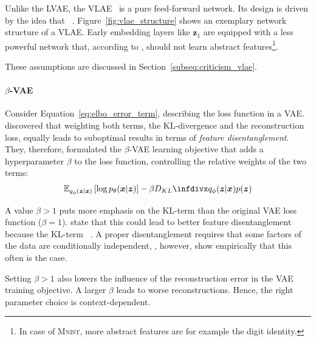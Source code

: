 Unlike the \ac{LVAE}, the \ac{VLAE}~\citep{zhao2017learning} is a pure feed-forward network.
Its design is driven by the idea that ~\citep{zhao2017learning}.
Figure~\ref{fig:vlae_structure} shows an exemplary network structure of a \ac{VLAE}.
Early embedding layers like $\bm{z}_1$ are equipped with a less powerful network that, according to \citet{zhao2017learning}, should not learn abstract features\footnote{In case of \textsc{Mnist}, more abstract features are for example the digit identity.}.

These assumptions are discussed in Section~\ref{subseq:criticism_vlae}.

\paragraph{$\beta$-VAE}

Consider Equation~\ref{eq:elbo_error_term}, describing the loss function in a \ac{VAE}.
\citet{higgins2017beta} discovered that weighting both terms, the KL-divergence and the reconstruction loss, equally leads to suboptimal results in terms of \textit{feature disentanglement}.
They, therefore, formulated the $\beta$-VAE learning objective that adds a hyperparameter $\beta$ to the loss function, controlling the relative weights of the two terms:
\begin{align}
    \mathbb{E}_{q_{\phi}(\bm{z} | \bm{x})}\left[\log p_{\theta}(\bm{x} | \bm{z})\right]-\beta \kldiv{q_{\phi}(\bm{z} | \bm{x})}{p(\bm{z})} \label{eq:beta-vae}
\end{align}

A value $\beta > 1$ puts more emphasis on the KL-term than the original \ac{VAE} loss function ($\beta = 1$).
\citet{higgins2017beta} state that this could lead to better feature disentanglement because the KL-term ~\citep{higgins2017beta}.
A proper disentanglement requires that some factors of the data are conditionally independent, \citet{higgins2017beta}, however, show empirically that this often is the case.

Setting $\beta > 1$ also lowers the influence of the reconstruction error in the \ac{VAE} training objective.
A larger $\beta$ leads to worse reconstructions.
Hence, the right parameter choice is context-dependent.

